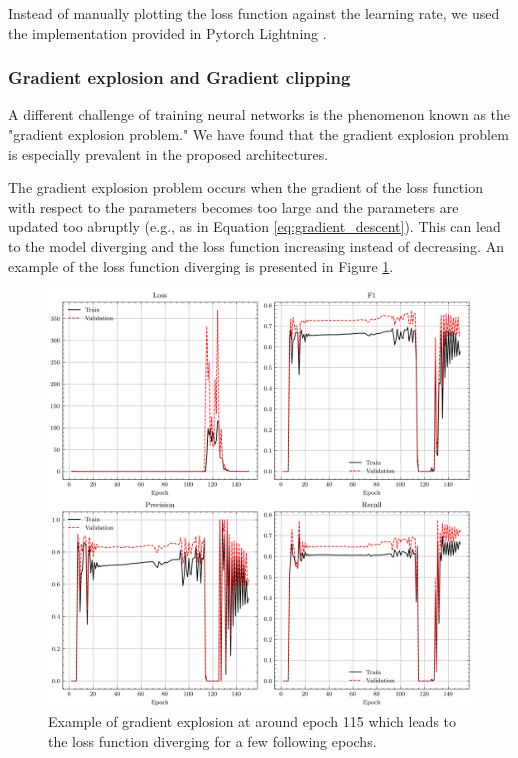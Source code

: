 \documentclass[a4paper, twoside]{report}
\theoremstyle{definition}
\numberwithin{equation}{section}
\begin{document}
Instead of manually plotting the loss function against the learning rate, we used the implementation
provided in Pytorch Lightning \cite{lightning.ai_2023_lr_finder}.


\subsubsection{Gradient explosion and Gradient clipping} \label{sec:gradient_clipping}
A different challenge of training neural networks is the phenomenon known as the "gradient explosion problem."
We have found that the gradient explosion problem is especially prevalent in the proposed architectures.

The gradient explosion problem occurs when the gradient of the loss function with respect to the parameters
becomes too large and the parameters are updated too abruptly (e.g., as in Equation \ref{eq:gradient_descent}).
This can lead to the model diverging and the loss function increasing instead of decreasing.
An example of the loss function diverging is presented in Figure \ref{fig:gradient_explosion}.

\begin{figure}[h!]
    \centering
    \includegraphics[scale=0.6]{gradient_explosion.png}
    \caption{Example of gradient explosion at around epoch 115 which leads to the loss function diverging for a few following epochs.}
    \label{fig:gradient_explosion}
\end{figure}
\end{document}
